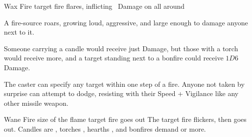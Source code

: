   {}%
  {Wax}%
  {Fire}%
  {}%
  {target fire flares, inflicting \showDam\ Damage on all around}%
  {
    A fire-source roars, growing loud, aggressive, and large enough to damage anyone next to it.

    Someone carrying a candle would receive just  Damage, but those with a torch would receive more, and a target standing next to a bonfire could receive $1D6$ Damage.

    The caster can specify any target within one step of a fire.
    Anyone not taken by surprise can attempt to dodge, resisting with their Speed + Vigilance like any other missile weapon.
  }

  {}%
  {Wane}%
  {Fire}%
  {size of the flame}%
  {target fire goes out}%
  {
    The target fire flickers, then goes out.
    Candles are \tn[6], torches \tn[7], hearths \tn[8], and bonfires demand \tn[9] or more.
  }
